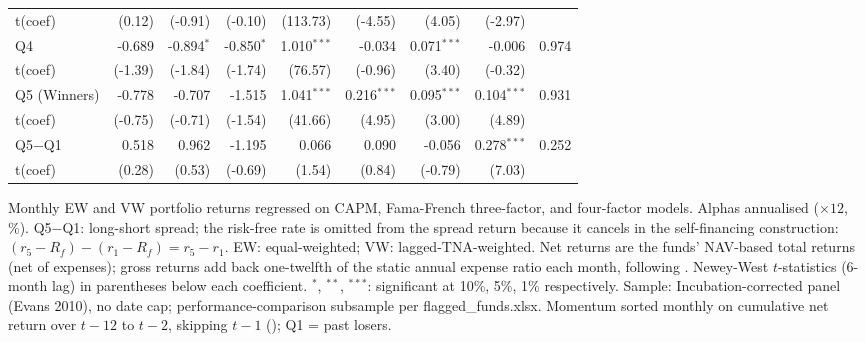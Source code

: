 {\begin{longtable}[t]{lrrrrrrrr}
\hspace{1em}t(coef) & (0.12) & (-0.91) & (-0.10) & (113.73) & (-4.55) & (4.05) & (-2.97) & \\
\hspace{1em}Q4 & -0.689 & -0.894$^{*}$ & -0.850$^{*}$ & 1.010$^{***}$ & -0.034 & 0.071$^{***}$ & -0.006 & 0.974\\
\hspace{1em}t(coef) & (-1.39) & (-1.84) & (-1.74) & (76.57) & (-0.96) & (3.40) & (-0.32) & \\
\hspace{1em}Q5 (Winners) & -0.778 & -0.707 & -1.515 & 1.041$^{***}$ & 0.216$^{***}$ & 0.095$^{***}$ & 0.104$^{***}$ & 0.931\\
\hspace{1em}t(coef) & (-0.75) & (-0.71) & (-1.54) & (41.66) & (4.95) & (3.00) & (4.89) & \\
\hspace{1em}Q5$-$Q1 & 0.518 & 0.962 & -1.195 & 0.066 & 0.090 & -0.056 & 0.278$^{***}$ & 0.252\\
\hspace{1em}t(coef) & (0.28) & (0.53) & (-0.69) & (1.54) & (0.84) & (-0.79) & (7.03) & \\*
\end{longtable}
}
\begin{singlespace}\footnotesize\noindent
Monthly EW and VW portfolio returns regressed on CAPM, Fama-French three-factor, and \textcite{Carhart1997} four-factor models. Alphas annualised ($\times 12$, \%). Q5$-$Q1: long-short spread; the risk-free rate is omitted from the spread return because it cancels in the self-financing construction: $(r_5 - R_f) - (r_1 - R_f) = r_5 - r_1$. EW: equal-weighted; VW: lagged-TNA-weighted. Net returns are the funds' NAV-based total returns (net of expenses); gross returns add back one-twelfth of the static annual expense ratio each month, following \textcite{FamaFrench2010}. Newey-West $t$-statistics (6-month lag) in parentheses below each coefficient. $^{*}$, $^{**}$, $^{***}$: significant at 10\%, 5\%, 1\% respectively. Sample: Incubation-corrected panel (Evans 2010), no date cap; performance-comparison subsample per flagged\_funds.xlsx. Momentum sorted monthly on cumulative net return over $t-12$ to $t-2$, skipping $t-1$ (\citealt{JegadeeshTitman1993}); Q1 = past losers.
\end{singlespace}\par\vspace{24pt}


